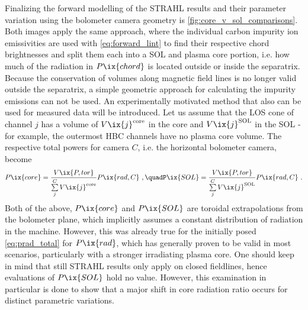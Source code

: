             Finalizing the forward modelling of the STRAHL results and their parameter variation using the bolometer camera geometry is \cref{fig:core_v_sol_comparisons}. Both images apply the same approach, where the individual carbon impurity ion emissivities are used with \cref{eq:forward_lint} to find their respective chord brightnesses and split them each into a SOL and plasma core portion, i.e. how much of the radiation in $P\ix{chord}$ is located outside or inside the separatrix. Because the conservation of volumes along magnetic field lines is no longer valid outside the separatrix, a simple geometric approach for calculating the impurity emissions can not be used. An experimentally motivated method that also can be used for measured data will be introduced. Let us assume that the LOS cone of channel $j$ has a volume of $V\ix{j}^{\text{core}}$ in the core and $V\ix{j}^{\text{SOL}}$ in the SOL - for example, the outermost HBC channels have no plasma core volume. The respective total powers for camera $C$, i.e. the horizontal bolometer camera, become%
%
            \begin{align}%
                P\ix{core}=\frac{V\ix{P,tor}}{\sum\limits_{j}^{C}V\ix{j}^{\text{core}}}P\ix{rad,C}%
                \,\,,\quad%
                P\ix{SOL}=\frac{V\ix{P,tor}}{\sum\limits_{j}^{C}V\ix{j}^{\text{SOL}}}P\ix{rad,C}\,\,.%
                \label{eq:prad_corevsol}%
            \end{align}%
%
            Both of the above, $P\ix{core}$ and $P\ix{SOL}$ are toroidal extrapolations from the bolometer plane, which implicitly assumes a constant distribution of radiation in the machine. However, this was already true for the initially posed \cref{eq:prad_total} for $P\ix{rad}$, which has generally proven to be valid in most scenarios\cite{Klinger2019,Zhang2018}, particularly with a stronger irradiating plasma core. One should keep in mind that still STRAHL results only apply on closed fieldlines, hence evaluations of $P\ix{SOL}$ hold no value. However, this examination in particular is done to show that a major shift in core radiation ratio occurs for distinct parametric variations.\\%
